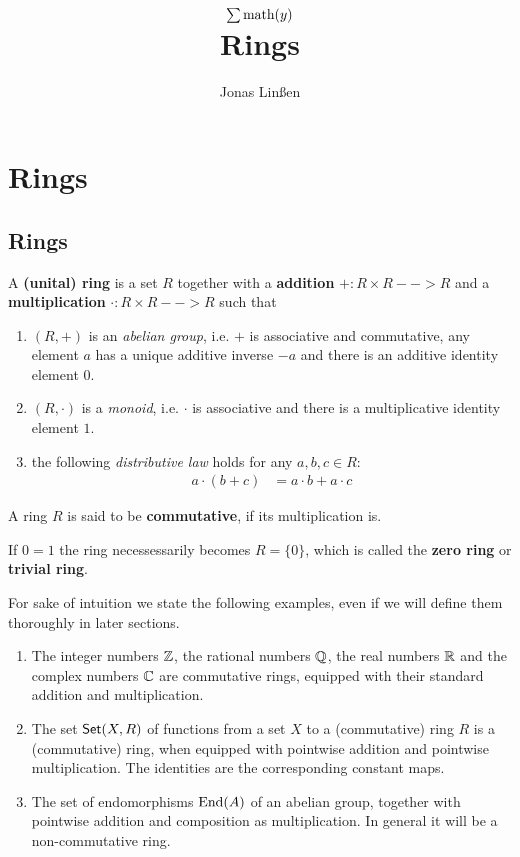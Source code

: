 

\title{
	$\sum \text{math}(y)$\\
	Rings
}
\author{Jonas Linßen}


	\maketitle
	\tableofcontents

	\newpage
	\section{Rings}
	\subsection{Rings}

	\begin{definition}
		A \textbf{(unital) ring} is a set $R$ together with a \textbf{addition} $+: R \times R --> R$ and a \textbf{multiplication} $\cdot: R \times R --> R$ such that 
		\begin{enumerate}[$\bullet$]
			\item{
				$(R,+)$ is an \textit{abelian group}, i.e. $+$ is associative and commutative, any element $a$ has a unique additive inverse $-a$ and there is an additive identity element $0$. 
			}
			\item{
				$(R,\cdot)$ is a \textit{monoid}, i.e. $\cdot$ is associative and there is a multiplicative identity element $1$.
			}
			\item{
				the following \textit{distributive law} holds for any $a,b,c \in R$:
				\begin{align*}
					a \cdot (b+c) &= a \cdot b + a \cdot c
				\end{align*}
			}
		\end{enumerate}

		A ring $R$ is said to be \textbf{commutative}, if its multiplication is.

		If $0 = 1$ the ring necessessarily becomes $R = \{0\}$, which is called the \textbf{zero ring} or \textbf{trivial ring}.
	\end{definition}

	For sake of intuition we state the following examples, even if we will define them thoroughly in later sections.
	\begin{enumerate}[$\bullet$]
		\item{
			The integer numbers $\mathbb{Z}$, the rational numbers $\mathbb{Q}$, the real numbers $\mathbb{R}$ and the complex numbers $\mathbb{C}$ are commutative rings, equipped with their standard addition and multiplication.
		}
		\item{
			The set $\textsf{Set}(X,R)$ of functions from a set $X$ to a (commutative) ring $R$ is a (commutative) ring, when equipped with pointwise addition and pointwise multiplication. The identities are the corresponding constant maps.
		}
		\item{
			The set of endomorphisms $\operatorname{End}(A)$ of an abelian group, together with pointwise addition and composition as multiplication. In general it will be a non-commutative ring.
		}
	\end{enumerate}

